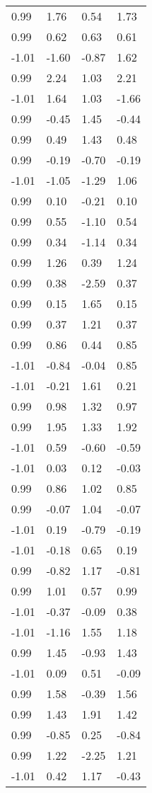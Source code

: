 \documentclass[
  doc,draftall]{apa6}
\begin{document}
\begin{table}[tbp]
\begin{center}
\begin{threeparttable}
\begin{tabular}{llll}
0.99 & 1.76 & 0.54 & 1.73\\
0.99 & 0.62 & 0.63 & 0.61\\
-1.01 & -1.60 & -0.87 & 1.62\\
0.99 & 2.24 & 1.03 & 2.21\\
-1.01 & 1.64 & 1.03 & -1.66\\
0.99 & -0.45 & 1.45 & -0.44\\
0.99 & 0.49 & 1.43 & 0.48\\
0.99 & -0.19 & -0.70 & -0.19\\
-1.01 & -1.05 & -1.29 & 1.06\\
0.99 & 0.10 & -0.21 & 0.10\\
0.99 & 0.55 & -1.10 & 0.54\\
0.99 & 0.34 & -1.14 & 0.34\\
0.99 & 1.26 & 0.39 & 1.24\\
0.99 & 0.38 & -2.59 & 0.37\\
0.99 & 0.15 & 1.65 & 0.15\\
0.99 & 0.37 & 1.21 & 0.37\\
0.99 & 0.86 & 0.44 & 0.85\\
-1.01 & -0.84 & -0.04 & 0.85\\
-1.01 & -0.21 & 1.61 & 0.21\\
0.99 & 0.98 & 1.32 & 0.97\\
0.99 & 1.95 & 1.33 & 1.92\\
-1.01 & 0.59 & -0.60 & -0.59\\
-1.01 & 0.03 & 0.12 & -0.03\\
0.99 & 0.86 & 1.02 & 0.85\\
0.99 & -0.07 & 1.04 & -0.07\\
-1.01 & 0.19 & -0.79 & -0.19\\
-1.01 & -0.18 & 0.65 & 0.19\\
0.99 & -0.82 & 1.17 & -0.81\\
0.99 & 1.01 & 0.57 & 0.99\\
-1.01 & -0.37 & -0.09 & 0.38\\
-1.01 & -1.16 & 1.55 & 1.18\\
0.99 & 1.45 & -0.93 & 1.43\\
-1.01 & 0.09 & 0.51 & -0.09\\
0.99 & 1.58 & -0.39 & 1.56\\
0.99 & 1.43 & 1.91 & 1.42\\
0.99 & -0.85 & 0.25 & -0.84\\
0.99 & 1.22 & -2.25 & 1.21\\
-1.01 & 0.42 & 1.17 & -0.43\\

\end{tabular}
\end{threeparttable}
\end{center}
\end{table}
\end{document}
